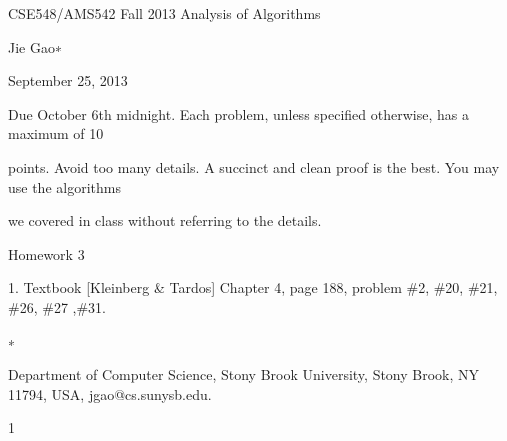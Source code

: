 \documentclass[a4paper,portrait,12pt]{article}
\begin{document}
\begin{flushleft}
CSE548/AMS542 Fall 2013 Analysis of Algorithms
\end{flushleft}


\begin{flushleft}
Jie Gao∗
\end{flushleft}


\begin{flushleft}
September 25, 2013
\end{flushleft}





\begin{flushleft}
Due October 6th midnight. Each problem, unless specified otherwise, has a maximum of 10
\end{flushleft}


\begin{flushleft}
points. Avoid too many details. A succinct and clean proof is the best. You may use the algorithms
\end{flushleft}


\begin{flushleft}
we covered in class without referring to the details.
\end{flushleft}





\begin{flushleft}
Homework 3
\end{flushleft}


\begin{flushleft}
1. Textbook [Kleinberg \& Tardos] Chapter 4, page 188, problem \#2, \#20, \#21, \#26, \#27 ,\#31.
\end{flushleft}





∗





\begin{flushleft}
Department of Computer Science, Stony Brook University, Stony Brook, NY 11794, USA, jgao@cs.sunysb.edu.
\end{flushleft}





1





\newpage
\end{document}
